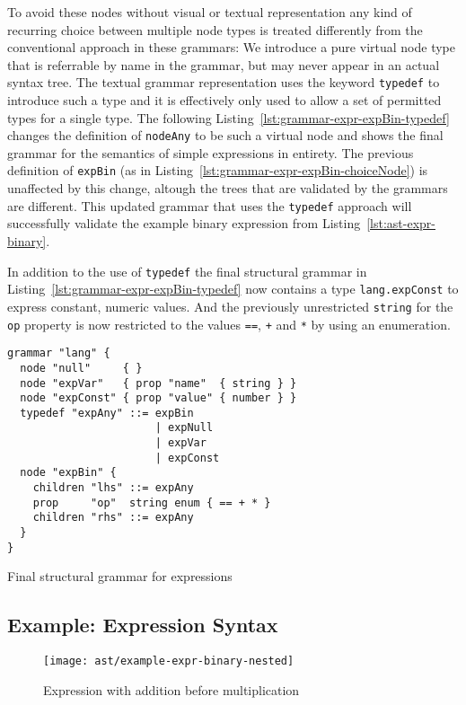 \documentclass[sigconf,natbib=false]{acmart}
\newcommand\astScale{0.7}
\begin{document}
To avoid these nodes without visual or textual representation any kind of recurring choice between multiple node types is treated differently from the conventional approach in these grammars: We introduce a pure virtual node type that is referrable by name in the grammar, but may never appear in an actual syntax tree. The textual grammar representation uses the keyword \texttt{typedef} to introduce such a type and it is effectively only used to allow a set of permitted types for a single type. The following Listing~\ref{lst:grammar-expr-expBin-typedef} changes the definition of \texttt{nodeAny} to be such a virtual node and shows the final grammar for the semantics of simple expressions in entirety. The previous definition of \texttt{expBin} (as in Listing~\ref{lst:grammar-expr-expBin-choiceNode}) is unaffected by this change, altough the trees that are validated by the grammars are different. This updated grammar that uses the \texttt{typedef} approach will successfully validate the example binary expression from Listing~\ref{lst:ast-expr-binary}.

In addition to the use of \texttt{typedef} the final structural grammar in Listing~\ref{lst:grammar-expr-expBin-typedef} now contains a type \texttt{lang.expConst} to express constant, numeric values. And the previously unrestricted \texttt{string} for the \texttt{op} property is now restricted to the values \texttt{==}, \texttt{+} and \texttt{*} by using an enumeration.

\begin{listing}
\begin{verbatim}
grammar "lang" {
  node "null"     { }
  node "expVar"   { prop "name"  { string } }
  node "expConst" { prop "value" { number } }
  typedef "expAny" ::= expBin
                       | expNull
                       | expVar
                       | expConst
  node "expBin" {
    children "lhs" ::= expAny
    prop     "op"  string enum { == + * }
    children "rhs" ::= expAny
  }
}
\end{verbatim}

\caption{Final structural grammar for expressions}
\label{lst:grammar-expr-expBin-typedef}
\end{listing}

\subsection{Example: Expression Syntax}

\begin{figure}
  \texttt{[image: ast/example-expr-binary-nested]}
  \caption{Expression with addition before multiplication}
  \label{fig:ast-nested-ambiguous}
\end{figure}
\end{document}
